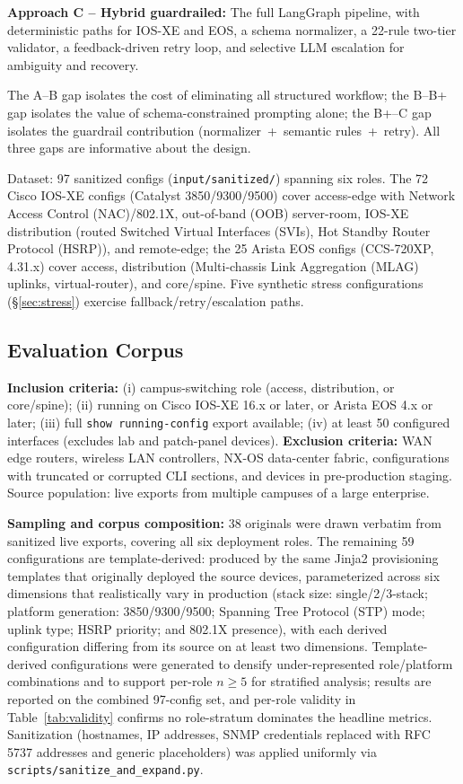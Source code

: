 \documentclass[conference]{IEEEtran}
\begin{document}
\textbf{Approach C -- Hybrid guardrailed:} The full LangGraph pipeline, with deterministic paths for IOS-XE and EOS, a schema normalizer, a 22-rule two-tier validator, a feedback-driven retry loop, and selective LLM escalation for ambiguity and recovery.

The A--B gap isolates the cost of eliminating all structured workflow; the B--B+ gap isolates the value of schema-constrained prompting alone; the B+--C gap isolates the guardrail contribution (normalizer~+~semantic rules~+~retry). All three gaps are informative about the design.

Dataset: 97 sanitized configs (\texttt{input/sanitized/}) spanning six roles. The 72 Cisco IOS-XE configs (Catalyst 3850/9300/9500) cover access-edge with Network Access Control (NAC)/802.1X, out-of-band (OOB) server-room, IOS-XE distribution (routed Switched Virtual Interfaces (SVIs), Hot Standby Router Protocol (HSRP)), and remote-edge; the 25 Arista EOS configs (CCS-720XP, 4.31.x) cover access, distribution (Multi-chassis Link Aggregation (MLAG) uplinks, virtual-router), and core/spine. Five synthetic stress configurations (§\ref{sec:stress}) exercise fallback/retry/escalation paths.

\subsection{Evaluation Corpus}
\label{sec:corpus}

\textbf{Inclusion criteria:} (i) campus-switching role (access, distribution, or core/spine); (ii) running on Cisco IOS-XE 16.x or later, or Arista EOS 4.x or later; (iii) full \texttt{show running-config} export available; (iv) at least 50 configured interfaces (excludes lab and patch-panel devices). \textbf{Exclusion criteria:} WAN edge routers, wireless LAN controllers, NX-OS data-center fabric, configurations with truncated or corrupted CLI sections, and devices in pre-production staging. Source population: live exports from multiple campuses of a large enterprise.

\textbf{Sampling and corpus composition:} 38 originals were drawn verbatim from sanitized live exports, covering all six deployment roles. The remaining 59 configurations are template-derived: produced by the same Jinja2 provisioning templates that originally deployed the source devices, parameterized across six dimensions that realistically vary in production (stack size: single/2/3-stack; platform generation: 3850/9300/9500; Spanning Tree Protocol (STP) mode; uplink type; HSRP priority; and 802.1X presence), with each derived configuration differing from its source on at least two dimensions. Template-derived configurations were generated to densify under-represented role/platform combinations and to support per-role $n \geq 5$ for stratified analysis; results are reported on the combined 97-config set, and per-role validity in Table~\ref{tab:validity} confirms no role-stratum dominates the headline metrics. Sanitization (hostnames, IP addresses, SNMP credentials replaced with RFC 5737 addresses and generic placeholders) was applied uniformly via \texttt{scripts/sanitize\_and\_expand.py}.
\end{document}
